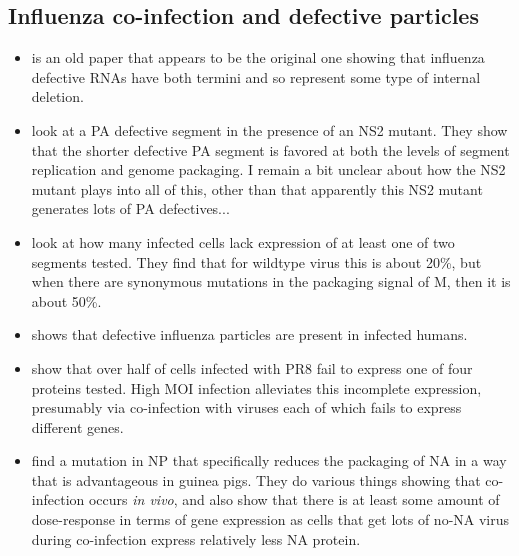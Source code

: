 \documentclass[9pt,lineno]{elife}
\begin{document}
\subsection{Influenza co-infection and defective particles}
\begin{itemize}

\item \citet{davis1980influenza} is an old paper that appears to be the original one showing that influenza defective RNAs have both termini and so represent some type of internal deletion.

\item \citet{odagiri1997segment} look at a PA defective segment in the presence of an NS2 mutant.
They show that the shorter defective PA segment is favored at both the levels of segment replication and genome packaging. 
I remain a bit unclear about how the NS2 mutant plays into all of this, other than that apparently this NS2 mutant generates lots of PA defectives...

\item \citet{hutchinson2008mutational} look at how many infected cells lack expression of at least one of two segments tested.
They find that for wildtype virus this is about 20\%, but when there are synonymous mutations in the packaging signal of M, then it is about 50\%.

\item \citet{saira2013sequence} shows that defective influenza particles are present in infected humans.

\item \citet{brooke2013most} show that over half of cells infected with PR8 fail to express one of four proteins tested.
High MOI infection alleviates this incomplete expression, presumably via co-infection with viruses each of which fails to express different genes.

\item \citet{brooke2014influenza} find a mutation in NP that specifically reduces the packaging of NA in a way that is advantageous in guinea pigs.
They do various things showing that co-infection occurs \textit{in vivo}, and also show that there is at least some amount of dose-response in terms of gene expression as cells that get lots of no-NA virus during co-infection express relatively less NA protein.


\end{itemize}
\end{document}
